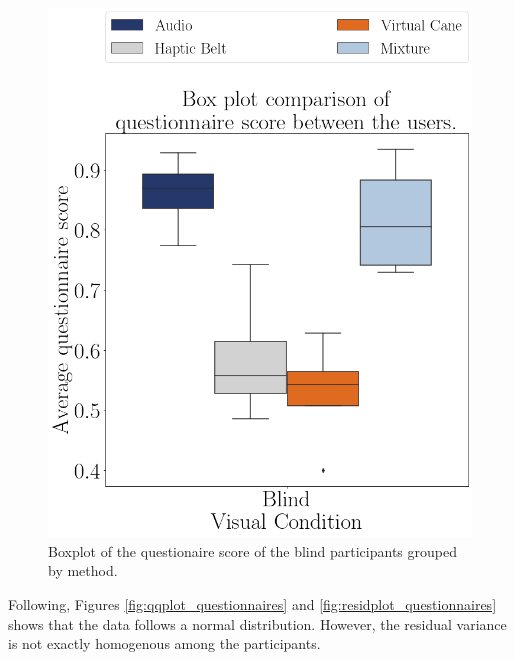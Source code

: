 \begin{figure}[!htb]
    \centering
    \includegraphics[width = 0.6\linewidth]{Resultados/Questionario/Figuras/png/boxplot_questionnaire_scene_blind.png}
    \caption{Boxplot of the questionaire score of the blind participants grouped by method.}
    \label{fig:boxplot_quest_blind_scene}
\end{figure}

%
%

Following, Figures \ref{fig:qqplot_questionnaires} and \ref{fig:residplot_questionnaires} shows that the data follows a normal distribution. However, the residual variance is not exactly homogenous among the participants. 

